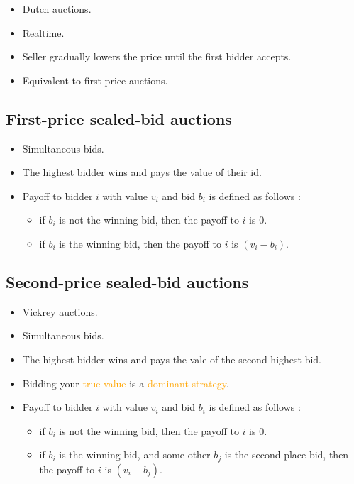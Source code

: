 \begin{itemize}
\item Dutch auctions.
\item Realtime.
\item Seller gradually lowers the price until the first bidder accepts.
\item Equivalent to first-price auctions.
\end{itemize}

\subsection{First-price sealed-bid auctions}

\begin{itemize}
\item Simultaneous bids.
\item The highest bidder wins and pays the value of their id.
\item Payoff to bidder $i$ with value $v_i$ and bid $b_i$ is defined as follows :
	\begin{itemize}
	\item if $b_i$ is not the winning bid, then the payoff to $i$ is $0$.
	\item if $b_i$ is the winning bid, then the payoff to $i$ is $(v_i - b_i)$.
	\end{itemize}
\end{itemize}

\subsection{Second-price sealed-bid auctions}

\begin{itemize}
\item Vickrey auctions.
\item Simultaneous bids.
\item The highest bidder wins and pays the vale of the second-highest bid.
\item Bidding your \textcolor{orange}{true value} is a \textcolor{orange}{dominant strategy}.
\item Payoff to bidder $i$ with value $v_i$ and bid $b_i$ is defined as follows :
	\begin{itemize}
	\item if $b_i$ is not the winning bid, then the payoff to $i$ is $0$.
	\item if $b_i$ is the winning bid, and some other $b_j$ is the second-place bid, then the payoff to $i$ is $(v_i - b_j)$.
	\end{itemize}
\end{itemize}

